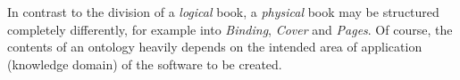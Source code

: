 In contrast to the division of a \emph{logical} book, a \emph{physical} book
may be structured completely differently, for example into \emph{Binding},
\emph{Cover} and \emph{Pages}. Of course, the contents of an ontology heavily
depends on the intended area of application (knowledge domain) of the software
to be created.
